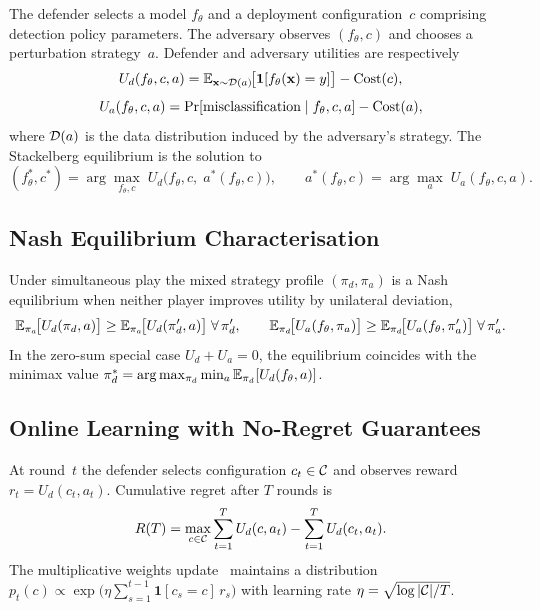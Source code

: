 The defender selects a model $f_\theta$ and a deployment configuration~$c$ comprising detection policy parameters. The adversary observes $(f_\theta,c)$ and chooses a perturbation strategy~$a$. Defender and adversary utilities are respectively
\begin{equation}
U_d(f_\theta,c,a)
= \mathbb{E}_{\mathbf{x}\sim\mathcal{D}(a)}\!\bigl[\mathbf{1}[f_\theta(\mathbf{x})=y]\bigr] - \mathrm{Cost}(c),
\label{eq:game_ud}
\end{equation}\begin{equation}
U_a(f_\theta,c,a)
= \mathrm{Pr}[\text{misclassification}\mid f_\theta,c,a] - \mathrm{Cost}(a),
\label{eq:game_ua}
\end{equation}
where $\mathcal{D}(a)$ is the data distribution induced by the adversary's strategy. The Stackelberg equilibrium is the solution to
\begin{equation}
(f_\theta^*,c^*)
= \arg\max_{f_\theta,c}\;U_d\!\bigl(f_\theta,c,\;a^*(f_\theta,c)\bigr),
\qquad
a^*(f_\theta,c)=\arg\max_a\;U_a(f_\theta,c,a).
\label{eq:game_stackel}
\end{equation}

\subsection{Nash Equilibrium Characterisation}

Under simultaneous play the mixed strategy profile $(\pi_d,\pi_a)$ is a Nash equilibrium when neither player improves utility by unilateral deviation,
\begin{equation}
\mathbb{E}_{\pi_a}\!\bigl[U_d(\pi_d,a)\bigr]
\ge \mathbb{E}_{\pi_a}\!\bigl[U_d(\pi_d',a)\bigr]\;\forall\,\pi_d',
\qquad
\mathbb{E}_{\pi_d}\!\bigl[U_a(f_\theta,\pi_a)\bigr]
\ge \mathbb{E}_{\pi_d}\!\bigl[U_a(f_\theta,\pi_a')\bigr]\;\forall\,\pi_a'.
\label{eq:game_nash}
\end{equation}
In the zero-sum special case $U_d+U_a=0$, the equilibrium coincides with the minimax value $\pi_d^*=\arg\max_{\pi_d}\min_a\mathbb{E}_{\pi_d}[U_d(f_\theta,a)]$.

\subsection{Online Learning with No-Regret Guarantees}

At round~$t$ the defender selects configuration $c_t\in\mathcal{C}$ and observes reward $r_t=U_d(c_t,a_t)$. Cumulative regret after $T$ rounds is
\begin{equation}
R(T)
= \max_{c\in\mathcal{C}}\sum_{t=1}^{T}U_d(c,a_t)
  - \sum_{t=1}^{T}U_d(c_t,a_t).
\label{eq:game_regret}
\end{equation}
The multiplicative weights update~\cite{AroraHK2012,CesaBianchi2006} maintains a distribution $p_t(c)\propto\exp\!\bigl(\eta\sum_{s=1}^{t-1}\mathbf{1}[c_s{=}c]\,r_s\bigr)$ with learning rate $\eta=\sqrt{\log|\mathcal{C}|/T}$.

